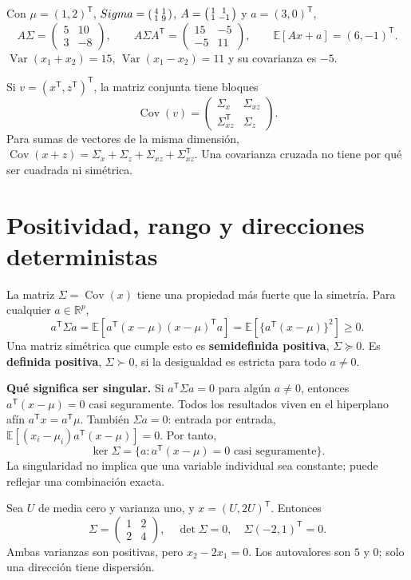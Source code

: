 \documentclass[11pt,a4paper]{article}
\newcommand{\R}{\mathbb R}
\newcommand{\E}{\mathbb E}
\newcommand{\T}{^{\mathsf T}}
\DeclareMathOperator{\Var}{Var}
\DeclareMathOperator{\Cov}{Cov}
\newcommand{\topic}[2]{\clearpage\section{#1}\label{#2}}
\theoremstyle{definition}\newtheorem{definicion}[teorema]{Definición}
\begin{document}
\begin{ejemplo}
Con $\mu=(1,2)\T$,
$\Sigma=\begin{psmallmatrix}4&1\\1&9\end{psmallmatrix}$,
$A=\begin{psmallmatrix}1&1\\1&-1\end{psmallmatrix}$ y $a=(3,0)\T$,
\[
A\Sigma=\begin{pmatrix}5&10\\3&-8\end{pmatrix},\qquad
A\Sigma A\T=\begin{pmatrix}15&-5\\-5&11\end{pmatrix},
\qquad \E[Ax+a]=(6,-1)\T.
\]
$\Var(x_1+x_2)=15$, $\Var(x_1-x_2)=11$ y su covarianza es $-5$.
\end{ejemplo}
Si $v=(x\T,z\T)\T$, la matriz conjunta tiene bloques
\[
\Cov(v)=
\begin{pmatrix}\Sigma_x&\Sigma_{xz}\\\Sigma_{xz}\T&\Sigma_z\end{pmatrix}.
\]
Para sumas de vectores de la misma dimensión,
$\Cov(x+z)=\Sigma_x+\Sigma_z+\Sigma_{xz}+\Sigma_{xz}\T$.
Una covarianza cruzada no tiene por qué ser cuadrada ni simétrica.

\topic{Positividad, rango y direcciones deterministas}{s13}
La matriz $\Sigma=\Cov(x)$ tiene una propiedad más fuerte que la simetría.
Para cualquier $a\in\R^p$,
\[
a\T\Sigma a
=\E[a\T(x-\mu)(x-\mu)\T a]
=\E[\{a\T(x-\mu)\}^2]\ge0.
\]
Una matriz simétrica que cumple esto es \textbf{semidefinida positiva},
$\Sigma\succeq0$. Es \textbf{definida positiva}, $\Sigma\succ0$, si la
desigualdad es estricta para todo $a\ne0$.

\textbf{Qué significa ser singular.}
Si $a\T\Sigma a=0$ para algún $a\ne0$, entonces
$a\T(x-\mu)=0$ casi seguramente.
Todos los resultados viven en el hiperplano afín $a\T x=a\T\mu$.
También $\Sigma a=0$: entrada por entrada,
$\E[(x_i-\mu_i)a\T(x-\mu)]=0$.
Por tanto,
\[
\ker\Sigma=\{a:a\T(x-\mu)=0\text{ casi seguramente}\}.
\]
La singularidad no implica que una variable individual sea constante;
puede reflejar una combinación exacta.

\begin{ejemplo}
Sea $U$ de media cero y varianza uno, y $x=(U,2U)\T$. Entonces
\[
\Sigma=\begin{pmatrix}1&2\\2&4\end{pmatrix},\quad
\det\Sigma=0,\quad
\Sigma(-2,1)\T=0.
\]
Ambas varianzas son positivas, pero $x_2-2x_1=0$.
Los autovalores son $5$ y $0$; solo una dirección tiene dispersión.
\end{ejemplo}
\end{document}
